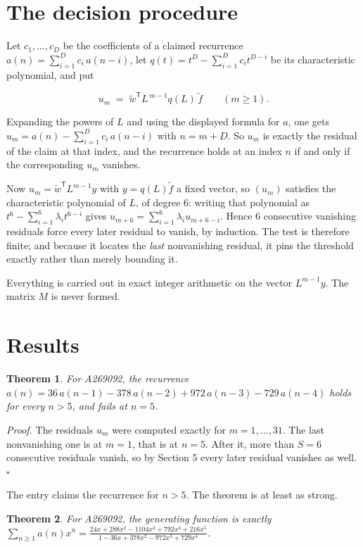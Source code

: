 \documentclass[11pt]{article}
\newtheorem{theorem}{Theorem}
\theoremstyle{definition}
\begin{document}
\section{The decision procedure}

Let $c_1,\dots,c_D$ be the coefficients of a claimed recurrence $a(n) = \sum_{i=1}^{D} c_i\,a(n-i)$, let $q(t) = t^{D} - \sum_{i=1}^{D} c_i t^{D-i}$ be its characteristic polynomial, and put

\[u_m \;=\; \tilde w^{\mathsf T} L^{\,m-1} q(L)\,\tilde f \qquad (m \ge 1).\]

Expanding the powers of $L$ and using the displayed formula for $a$, one gets $u_m = a(n) - \sum_{i=1}^{D} c_i\,a(n-i)$ with $n = m + D$. So $u_m$ is exactly the residual of the claim at that index, and the recurrence holds at an index $n$ if and only if the corresponding $u_m$ vanishes.

Now $u_m = \tilde w^{\mathsf T} L^{m-1} y$ with $y = q(L)\tilde f$ a fixed vector, so $(u_m)$ satisfies the characteristic polynomial of $L$, of degree $6$: writing that polynomial as $t^{6} - \sum_{i=1}^{6} \lambda_i t^{6-i}$ gives $u_{m+6} = \sum_{i=1}^{6} \lambda_i u_{m+6-i}$. Hence $6$ consecutive vanishing residuals force every later residual to vanish, by induction. The test is therefore finite; and because it locates the {\itshape last} nonvanishing residual, it pins the threshold exactly rather than merely bounding it.

Everything is carried out in exact integer arithmetic on the vector $L^{m-1}y$. The matrix $M$ is never formed.

\section{Results}

\begin{theorem} For A269092, the recurrence $a(n) = 36\,a(n-1) - 378\,a(n-2) + 972\,a(n-3) - 729\,a(n-4)$ holds for every $n > 5$, and fails at $n = 5$.\end{theorem}

{\itshape Proof.} The residuals $u_m$ were computed exactly for $m = 1,\dots,31$. The last nonvanishing one is at $m = 1$, that is at $n = 5$. After it, more than $S = 6$ consecutive residuals vanish, so by Section 5 every later residual vanishes as well. $\square$

The entry claims the recurrence for $n > 5$. The theorem is at least as strong.

\begin{theorem} For A269092, the generating function is exactly $\sum_{n\ge 1} a(n)x^n = \frac{24x + 288x^{2} - 1104x^{3} + 792x^{4} + 216x^{5}}{1 - 36x + 378x^{2} - 972x^{3} + 729x^{4}}$.\end{theorem}
\end{document}

